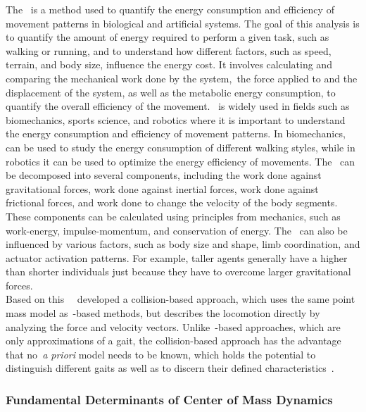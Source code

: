     The~ is a method used to quantify the energy consumption and efficiency of movement patterns in biological and artificial systems. The goal of this analysis is to quantify the amount of energy required to perform a given task, such as walking or running, and to understand how different factors, such as speed, terrain, and body size, influence the energy cost. It involves calculating and comparing the mechanical work done by the system,~\ie the force applied to and the displacement of the system, as well as the metabolic energy consumption, to quantify the overall efficiency of the movement.~ is widely used in fields such as biomechanics, sports science, and robotics where it is important to understand the energy consumption and efficiency of movement patterns. In biomechanics,~ can be used to study the energy consumption of different walking styles, while in robotics it can be used to optimize the energy efficiency of movements. The~ can be decomposed into several components, including the work done against gravitational forces, work done against inertial forces, work done against frictional forces, and work done to change the velocity of the body segments. These components can be calculated using principles from mechanics, such as work-energy, impulse-momentum, and conservation of energy. The~ can also be influenced by various factors, such as body size and shape, limb coordination, and actuator activation patterns. For example, taller agents generally have a higher~ than shorter individuals just because they have to overcome larger gravitational forces.~\cite{Biewener2018}\\

    Based on this~\citeauthor*{Lee2011}~\cite{Lee2011} developed a collision-based approach, which uses the same point mass model as~-based methods, but describes the locomotion directly by analyzing the force and velocity vectors. Unlike~-based approaches, which are only approximations of a gait, the collision-based approach has the advantage that no~\textit{a priori} model needs to be known, which holds the potential to distinguish different gaits as well as to discern their defined characteristics~\cite{Lee2011}. %
    
        \subsubsection{Fundamental Determinants of Center of Mass Dynamics}    

